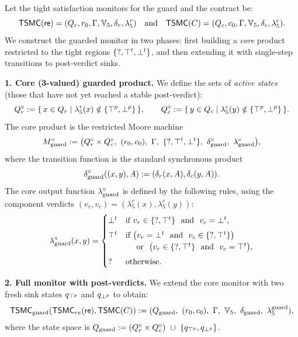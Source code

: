     \begin{definition}
      \label{def:moore-guard}
      Let the tight satisfaction monitors for the guard and the contract be:
      \[
      \mathsf{TSMC}(\mathsf{re})=(Q_r, r_0, \Gamma, \mathbb{V}_5 , \delta_r, \lambda_5^r)
      \quad\text{and}\quad
      \mathsf{TSMC}(C)=(Q_c, c_0, \Gamma, \mathbb{V}_5 , \delta_c, \lambda_5^c).
      \]
      We construct the guarded monitor in two phases: first building a \emph{core} product restricted to the tight regions \(\{\mathsf{?},\top^t,\bot^t\}\), and then extending it with single-step transitions to post-verdict sinks.
      
      \medskip
      \noindent\textbf{1. Core (3-valued) guarded product.}
      We define the sets of \emph{active states} (those that have not yet reached a stable post-verdict):
      \[
      Q_r^{\circ} := \{\,x\in Q_r \mid \lambda_5^r(x) \notin \{\top^p, \bot^p\}\,\},
      \qquad
      Q_c^{\circ} := \{\,y\in Q_c \mid \lambda_5^c(y) \notin \{\top^p, \bot^p\}\,\}.
      \]
      The core product is the restricted Moore machine
      \[
      M_{\guardd}^{\circ}:=
      \bigl(Q_r^{\circ}\times Q_c^{\circ},\ (r_0,c_0),\ \Gamma,\ \{\mathsf{?},\topt,\bott\},\ \delta_{\guardd}^{\circ},\ \lambda_{\guardd}^{\circ}\bigr),
      \]
      where the transition function is the standard synchronous product
      \[
      \delta_{\text{guard}}^{\circ}((x,y),A) := (\delta_r(x,A),\delta_c(y,A)).
      \]
      The core output function $\lambda_{\text{guard}}^{\circ}$ is defined by the following rules, using the component verdicts \((v_r,v_c)=(\lambda_5^r(x),\lambda_5^c(y))\):
      \[
      \lambda_{\guardd}^{\circ}(x,y)=
      \begin{cases}
      \bott & \text{if } v_r\in\{\mathsf{?},\topt\} \ \nd\ v_c=\bott,\\[4pt]
      \topt & \text{if } \bigl(v_r=\bott \ \nd\ v_c\in\{\mathsf{?},\topt\}\bigr) \\
            & \quad \sor\ \bigl(v_r\in\{\mathsf{?},\topt\} \ \nd\ v_c=\topt\bigr),\\[4pt]
      \mathsf{?} & \text{otherwise.}
      \end{cases}
      \]
      
      \medskip
      \noindent\textbf{2. Full monitor with post-verdicts.}
      We extend the core monitor with two fresh sink states \(q_{\top^p}\) and \(q_{\bot^p}\) to obtain:
      \[
      \tsmc_{\guardd}(\tsmc_{re}(\re),\tsmc(C))
      := (Q_{\guardd},\ (r_0,c_0),\ \Gamma,\ \tightverdicts,\ \delta_{\guardd},\ \lambda_5^{\guardd}),
      \]
      where the state space is \(Q_{\text{guard}}:=(Q_r^{\circ}\times Q_c^{\circ})\ \cup\ \{q_{\top^p},q_{\bot^p}\}\).
      

\end{definition}
